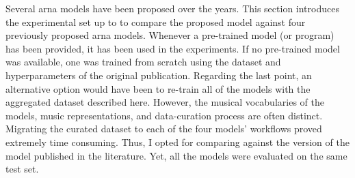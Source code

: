 
Several \gls{arna} models have been proposed over the years.
This section introduces the experimental set up to to
compare the proposed model against four previously proposed
\gls{arna} models. Whenever a pre-trained model (or program)
has been provided, it has been used in the experiments. If
no pre-trained model was available, one was trained from
scratch using the dataset and hyperparameters of the
original publication. Regarding the last point, an
alternative option would have been to re-train all of the
models with the aggregated dataset described here. However,
the musical vocabularies of the models, music
representations, and data-curation process are often
distinct. Migrating the curated dataset to each of the four
models' workflows proved extremely time consuming. Thus, I
opted for comparing against the version of the model
published in the literature. Yet, all the models were
evaluated on the same test set.
